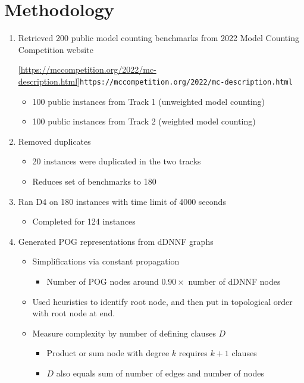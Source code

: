 \documentclass[letterpaper,USenglish,cleveref, autoref, thm-restate]{lipics-v2021}
\newcommand{\hcref}[1]{\cref{#1}{\small\tt #1}}
\begin{document}
\section*{Methodology}
\begin{enumerate}
   \item Retrieved 200 public model counting benchmarks from 2022 Model Counting Competition website
     \begin{center}
       \hcref{https://mccompetition.org/2022/mc-description.html}
     \end{center}
     \begin{itemize}
     \item 100 public instances from Track 1 (unweighted model counting)
     \item 100 public instances from Track 2 (weighted model counting)
     \end{itemize}
   \item Removed duplicates
     \begin{itemize}
    \item  20 instances were duplicated in the two tracks
     \item Reduces set of benchmarks to 180
     \end{itemize}
   \item Ran D4 on 180 instances with time limit of 4000 seconds
     \begin{itemize}
     \item Completed for 124 instances
     \end{itemize}
   \item Generated POG representations from dDNNF graphs
     \begin{itemize}
     \item Simplifications via constant propagation
       \begin{itemize}
       \item Number of POG nodes around $0{.}90\times$ number of dDNNF nodes
       \end{itemize}
     \item Used heuristics to identify root node, and then put in topological order with root node at end.
     \item Measure complexity by number of defining clauses $D$
       \begin{itemize}
       \item Product or sum node with degree $k$ requires $k+1$ clauses
       \item $D$ also equals sum of number of edges and number of nodes

\end{itemize}
\end{itemize}
\end{enumerate}
\end{document}
